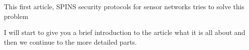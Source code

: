 This first article, SPINS security protocols for sensor networks tries to solve this problem

I will start to give you a brief introduction to the article what it is all about and then we continue to the more detailed parts.